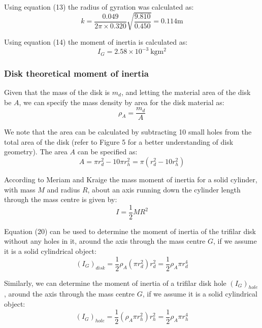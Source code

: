 \documentclass[a4paper]{article}
\begin{document}
Using equation (13) the radius of gyration was calculated as:
\begin{equation}
k = \frac{0.049}{2 \pi \times 0.320}\sqrt{\frac{9.810}{0.450}} = 0.114\si{\meter}
\end{equation}

Using equation (14) the moment of inertia is calculated as:
\begin{equation}
I_G = 2.58 \times 10^{-3} \ \si{\kilogram\meter^2}
\end{equation}

\subsubsection{Disk theoretical moment of inertia}
Given that the mass of the disk is $m_d$, and letting the material area of the disk be $A$, we can specify the mass density by area for the disk material as:
\begin{equation}
	\rho_A = \frac{m_d}{A}
\end{equation}

We note that the area can be calculated by subtracting 10 small holes from the total area of the disk (refer to Figure 5 for a better understanding of disk geometry). The area $A$ can be specified as:
\begin{equation}
	A = \pi r_d^2 - 10 \pi r_h^2 = \pi (r_d^2 - 10 r_h^2)
\end{equation}

According to Meriam and Kraige the mass moment of inertia for a solid cylinder, with mass $M$ and radius $R$, about an axis running down the cylinder length through the mass centre is given by:
\begin{equation}
I = \frac{1}{2}MR^2
\end{equation}

Equation (20) can be used to determine the moment of inertia of the trifilar disk without any holes in it, around the axis through the mass centre $G$, if we assume it is a solid cylindrical object:
\begin{equation}
(I_G)_{disk} = \frac{1}{2} \rho_A (\pi r_d^2) r_d^2 = \frac{1}{2} \rho_A \pi r_d^4
\end{equation}

Similarly, we can determine the moment of inertia of a trifilar disk hole $(I_G)_{hole}$, around the axis through the mass centre $G$, if we assume it is a solid cylindrical object:
\begin{equation}
(I_G)_{hole} = \frac{1}{2} (\rho_A \pi r_h^2) r_h^2 = \frac{1}{2} \rho_A \pi r_h^4
\end{equation}
\end{document}

